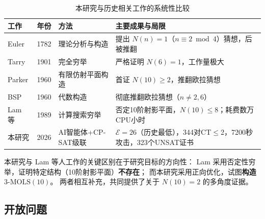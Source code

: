 \documentclass[11pt,a4paper]{ctexart}
\theoremstyle{remark}
\newcommand{\E}{\mathcal{E}}
\newcommand{\MOLS}{\mathrm{MOLS}}
\begin{document}
\begin{table}[htbp]
  \centering
  \caption{本研究与历史相关工作的系统性比较}
  \label{tab:comparison}
  \begin{tabular}{p{2.8cm}p{1.2cm}p{3cm}p{5.5cm}}
    \toprule
    工作 & 年份 & 方法 & 主要成果与局限 \\
    \midrule
    Euler \cite{euler1782} & 1782 & 理论分析与构造 & 提出 $N(n)=1$（$n \equiv 2 \bmod 4$）猜想，后被推翻 \\
    Tarry \cite{tarry1901} & 1901 & 完全穷举 & 严格证明 $N(6)=1$，工作量极大 \\
    Parker \cite{parker1960} & 1960 & 有限仿射平面构造 & 首证 $N(10)\ge 2$，推翻欧拉猜想 \\
    BSP \cite{bsp1960} & 1960 & 代数构造 & 彻底推翻欧拉猜想（$n \ne 2, 6$）\\
    Lam 等 \cite{lam1989} & 1989 & 计算搜索穷举 & 否定10阶射影平面，$N(10)\le 8$；耗费数万CPU小时 \\
    本研究 & 2026 & AI智能体+CP-SAT级联 & $\E=26$（历史最低），344对CT$\le$2，7200秒攻击，323个UNSAT证书 \\
    \bottomrule
  \end{tabular}
\end{table}

本研究与 Lam 等人工作的关键区别在于研究目标的方向性：
Lam 采用否定性穷举，证明特定结构（10阶射影平面）\textbf{不存在}；
而本研究采用正向优化，试图\textbf{构造} $3$-$\MOLS(10)$。
两者相互补充，共同提供了关于 $N(10) = 2$ 的多角度证据。

\subsection{开放问题}
\end{document}
